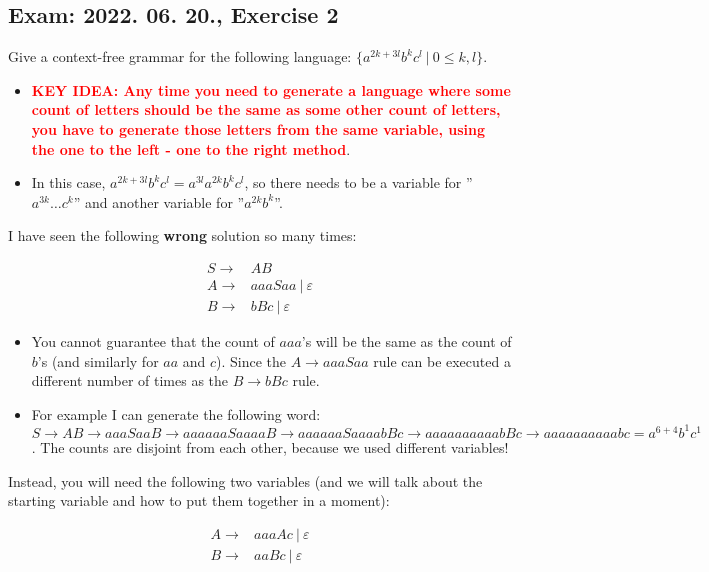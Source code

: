\subsection{Exam: 2022. 06. 20., Exercise 2}


Give a context-free grammar for the following language: $\{ a^{2k+3l}b^kc^l ~|~ 0\leq{} k,l \}$.


\begin{itemize}
    \item \textbf{\textcolor{red}{KEY IDEA: Any time you need to generate a language where some count of letters should be the same as some other count of letters, you have to generate those letters from the same variable, using the one to the left - one to the right method}}.
    \item In this case, $a^{2k+3l}b^kc^l = a^{3l}a^{2k}b^{k}c^{l}$, so there needs to be a variable for ''$a^{3k}\dots{}c^k$'' and another variable for ''$a^{2k}b^k$''.
\end{itemize}

I have seen the following \textbf{wrong} solution so many times:

\begin{align*}
S \rightarrow& AB\\
A \rightarrow& aaaSaa ~|~ \varepsilon\\
B \rightarrow& bBc ~|~ \varepsilon
\end{align*}

\begin{itemize}
    \item You cannot guarantee that the count of $aaa$'s will be the same as the count of $b$'s (and similarly for $aa$ and $c$). Since the $A \rightarrow aaaSaa$ rule can be executed a different number of times as the $B \rightarrow bBc$ rule.
    \item For example I can generate the following word: $S \rightarrow AB \rightarrow aaaSaaB \rightarrow aaaaaaSaaaaB \rightarrow aaaaaaSaaaabBc \rightarrow aaaaaaaaaabBc \rightarrow aaaaaaaaaabc = a^{6+4}b^{1}c^{1}$. The counts are disjoint from each other, because we used different variables!
\end{itemize}

Instead, you will need the following two variables (and we will talk about the starting variable and how to put them together in a moment):

\begin{align*}
A \rightarrow& aaaAc ~|~ \varepsilon \\
B \rightarrow& aaBc ~|~ \varepsilon
\end{align*}

